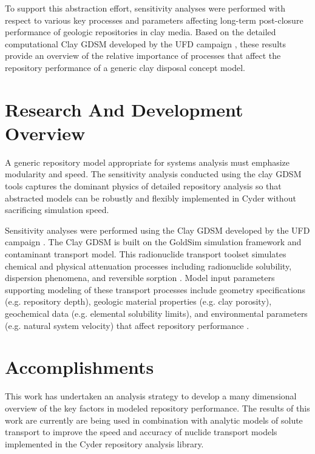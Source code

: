 \documentclass[letterpaper]{article}
\begin{document}
To support this abstraction effort, sensitivity analyses were performed with 
respect to various key processes and parameters affecting long-term post-closure 
performance of geologic repositories in clay media.  Based on the detailed 
computational Clay \gls{GDSM} developed by the \gls{UFD} campaign 
\cite{clayton_generic_2011}, these results provide an overview of the relative 
importance of processes that affect the repository performance of a generic clay 
disposal concept model. 

\section{Research And Development Overview}

A generic repository model appropriate for systems analysis must emphasize 
modularity and speed. The sensitivity analysis conducted using the clay 
\gls{GDSM} tools captures the dominant physics of detailed repository 
analysis so that abstracted models can be robustly and flexibly implemented in 
Cyder without sacrificing simulation speed.

Sensitivity analyses were performed using the Clay \gls{GDSM} developed by the 
\gls{UFD} campaign \cite{clayton_generic_2011}.  The Clay \gls{GDSM} is built on 
the GoldSim simulation framework and contaminant transport model.  This 
radionuclide transport toolset simulates chemical and physical attenuation 
processes including radionuclide solubility, dispersion phenomena, and 
reversible sorption \cite{golder_goldsim_2010, golder_goldsim_ct_2010}. Model 
input parameters supporting modeling of these transport processes include 
geometry specifications (e.g. repository depth), geologic material properties 
(e.g. clay porosity), geochemical data (e.g. elemental solubility limits), and 
environmental parameters (e.g. natural system velocity) that affect repository 
performance  \cite{nutt_generic_2009}. 

\section{Accomplishments}

This work has undertaken an analysis strategy to develop a many dimensional 
overview of the key factors in modeled repository performance. The results of 
this work are currently are being used in combination with analytic models of 
solute transport to improve the speed and accuracy of nuclide transport models 
implemented in the Cyder repository analysis library.
\end{document}
